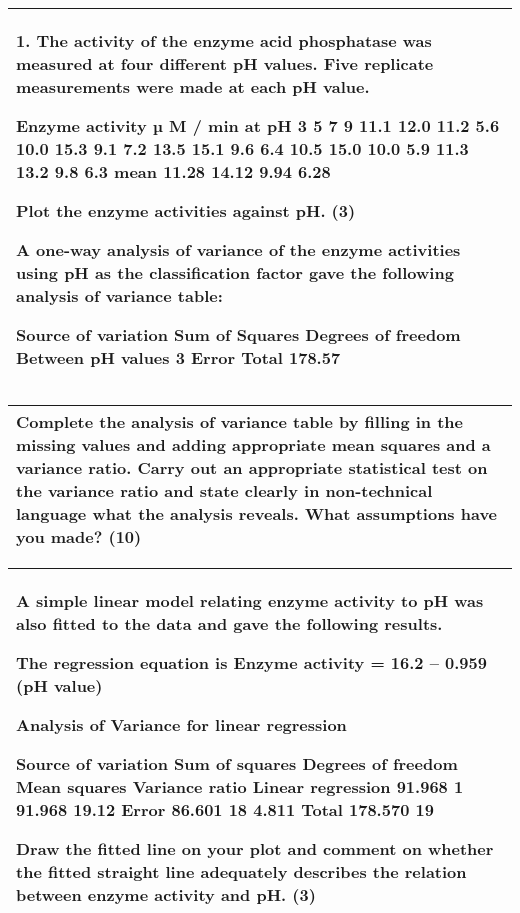 \documentclass[a4paper,12pt]{article}
\begin{document}
\begin{table}[ht!]
 \centering
 \begin{tabular}{|p{15cm}|}
 \hline  
1. The activity of the enzyme acid phosphatase was measured at four different pH values.  Five replicate measurements were made at each pH value. 
 
 Enzyme activity 
µ M / min at pH  3 5 7 9  11.1 12.0 11.2 5.6  10.0 15.3 9.1 7.2  13.5 15.1 9.6 6.4  10.5 15.0 10.0 5.9  11.3 13.2 9.8 6.3 mean 11.28 14.12 9.94 6.28 
 
 Plot the enzyme activities against pH.            (3) 
 
 A one-way analysis of variance of the enzyme activities using pH as the classification factor gave the following analysis of variance table: 
 
Source of variation Sum of Squares Degrees of freedom Between pH values  3 Error   Total 178.57  
\\ \hline
  \end{tabular}
\end{table}
\begin{table}[ht!]
 \centering
 \begin{tabular}{|p{15cm}|}
 \hline  
Complete the analysis of variance table by filling in the missing values and adding appropriate mean squares and a variance ratio.  Carry out an appropriate statistical test on the variance ratio and state clearly in non-technical language what the analysis reveals.  What assumptions have you made?        (10) 
\\ \hline
  \end{tabular}
\end{table}
\begin{table}[ht!]
 \centering
 \begin{tabular}{|p{15cm}|}
 \hline  
 A simple linear model relating enzyme activity to pH was also fitted to the data and gave the following results. 
 
  The regression equation is  Enzyme activity  =  16.2 – 0.959 (pH value) 
 
 Analysis of Variance for linear regression 
 
Source of variation 
Sum of squares 
Degrees of freedom 
Mean squares 
Variance ratio 
Linear regression 
91.968 1 91.968 19.12 
Error 86.601 18 4.811  Total 178.570 19   
 
Draw the fitted line on your plot and comment on whether the fitted straight line adequately describes the relation between enzyme activity and pH.         (3)  
\\ \hline
  \end{tabular}
\end{table}
\end{document}
